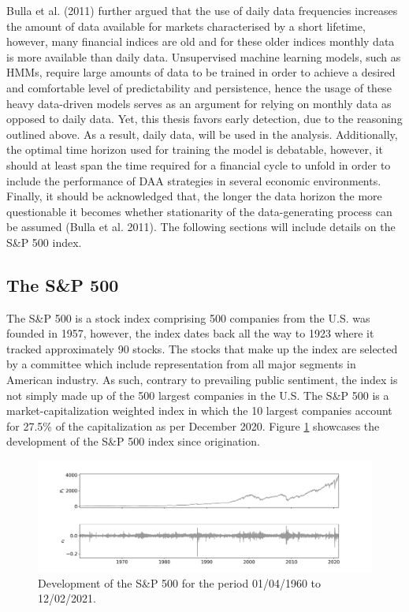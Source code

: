 Bulla et al. (2011) further argued that the use of daily data frequencies increases the amount of data available for markets characterised by a short lifetime, however, many financial indices are old and for these older indices monthly data is more available than daily data. Unsupervised machine learning models, such as HMMs, require large amounts of data to be trained in order to achieve a desired and comfortable level of predictability and persistence, hence the usage of these heavy data-driven models serves as an argument for relying on monthly data as opposed to daily data. Yet, this thesis favors early detection, due to the reasoning outlined above. As a result, daily data, will be used in the analysis. Additionally, the optimal time horizon used for training the model is debatable, however, it should at least span the time required for a financial cycle to unfold in order to include the performance of DAA strategies in several economic environments. Finally, it should be acknowledged that, the longer the data horizon the more questionable it becomes whether stationarity of the data-generating process can be assumed (Bulla et al. 2011). The following sections will include details on the S\&P 500 index.
 
\subsection{The S\&P 500}
The S\&P 500 is a stock index comprising 500 companies from the U.S. was founded in 1957, however, the index dates back all the way to 1923 where it tracked approximately 90 stocks. The stocks that make up the index are selected by a committee which include representation from all major segments in American industry. As such, contrary to prevailing public sentiment, the index is not simply made up of the 500 largest companies in the U.S. The S\&P 500 is a market-capitalization weighted index in which the 10 largest companies account for 27.5\% of the capitalization as per December 2020. Figure \ref{fig: SP500_index} showcases the development of the S\&P 500 index since origination. 
 
\begin{figure}[H] 
    \centering
    \includegraphics[width=1\textwidth]{analysis/data_description/images/SP500_index.png}
    \caption [Development of the S\&P 500] {Development of the S\&P 500 for the period 01/04/1960 to 12/02/2021.}
    \label{fig: SP500_index}
\end{figure}


